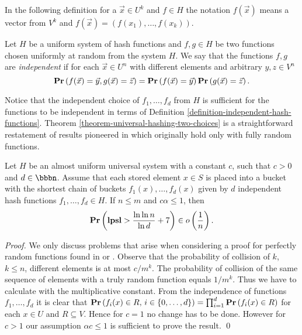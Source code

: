 In the following definition for a $\vec{x} \in U^k$ and $f \in H$ the notation $f(\vec{x})$ means a vector from $V^k$ and $f(\vec{x}) = (f(x_1), \dots, f(x_k))$.
\begin{definition}
\label{definition-independent-hash-functions}
Let $H$ be a uniform system of hash functions and $f, g \in H$ be two functions chosen uniformly at random from the system $H$. We say that the functions $f, g$ are \emph{independent} if for each $\vec{x} \in U^n$ with different elements and arbitrary $y, z \in V^n$ $$\mathbf{Pr}\left(f(\vec{x}) = \vec{y}, g(\vec{x}) = \vec{z}\right) = \mathbf{Pr}\left(f(\vec{x}) = \vec{y}\right) \mathbf{Pr}\left(g(\vec{x}) = \vec{z}\right).$$
\end{definition}

Notice that the independent choice of $f_1, \dots, f_d$ from $H$ is sufficient for the functions to be independent in terms of Definition \ref{definition-independent-hash-functions}. Theorem \ref{theorem-universal-hashing-two-choices} is a straightforward restatement of results pioneered in \cite{DBLP:conf/stoc/AzarBKU94} which originally hold only with fully random functions.

\begin{theorem}
\label{theorem-universal-hashing-two-choices}
Let $H$ be an almost uniform universal system with a constant $c$, such that $c > 0$ and $d \in \bbbn$. Assume that each stored element $x \in S$ is placed into a bucket with the shortest chain of buckets $f_1(x), \dots, f_d(x)$ given by $d$ independent hash functions $f_1, \dots, f_d \in H$. If $n \leq m$ and $c \alpha \leq 1$, then $$\mathbf{Pr}\left(\mathbf{lpsl} > \frac{\ln \ln n}{\ln d} + 7\right) \in o\left(\frac{1}{n}\right).$$
\end{theorem}
\begin{proof}
We only discuss problems that arise when considering a proof for perfectly random functions found in \cite{Mitzenmacher:2005:PCR:1076315} or \cite{DBLP:conf/stoc/AzarBKU94}. Observe that the probability of collision of $k$, $k \leq n$, different elements is at most ${c}/{m^k}$. The probability of collision of the same sequence of elements with a truly random function equals ${1}/{m^k}$. Thus we have to calculate with the multiplicative constant. From the independence of functions $f_1, \dots, f_d$ it is clear that $\mathbf{Pr}\left(f_i(x) \in R,\, i \in \{0, \dots, d\}\right) = \prod_{i = 1}^{d}\mathbf{Pr}\left(f_i(x) \in R\right)$ for each $x \in U$ and $R \subseteq V$. Hence for $c = 1$ no change has to be done. However for $c > 1$ our assumption $\alpha c \leq 1$ is sufficient to prove the result.
\qed
\end{proof}

